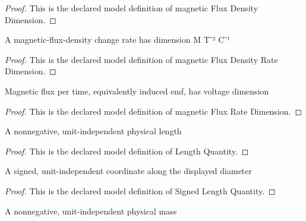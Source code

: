\begin{proof}
  This is the declared model definition of magnetic Flux Density Dimension.
\end{proof}
\begin{definition}
  \label{def:physics:phyx-mini-0927:phyxminiproblems-problemphyxmini0927-magneticfluxdensityratedimension}
  A magnetic-flux-density change rate has dimension M T⁻² C⁻¹
\end{definition}
\begin{proof}
  This is the declared model definition of magnetic Flux Density Rate Dimension.
\end{proof}
\begin{definition}
  \label{def:physics:phyx-mini-0927:phyxminiproblems-problemphyxmini0927-magneticfluxratedimension}
  Magnetic flux per time, equivalently induced emf, has voltage dimension
\end{definition}
\begin{proof}
  This is the declared model definition of magnetic Flux Rate Dimension.
\end{proof}
\begin{definition}
  \label{def:physics:phyx-mini-0927:phyxminiproblems-problemphyxmini0927-lengthquantity}
  A nonnegative, unit-independent physical length
\end{definition}
\begin{proof}
  This is the declared model definition of Length Quantity.
\end{proof}
\begin{definition}
  \label{def:physics:phyx-mini-0927:phyxminiproblems-problemphyxmini0927-signedlengthquantity}
  A signed, unit-independent coordinate along the displayed diameter
\end{definition}
\begin{proof}
  This is the declared model definition of Signed Length Quantity.
\end{proof}
\begin{definition}
  \label{def:physics:phyx-mini-0927:phyxminiproblems-problemphyxmini0927-massquantity}
  A nonnegative, unit-independent physical mass
\end{definition}
